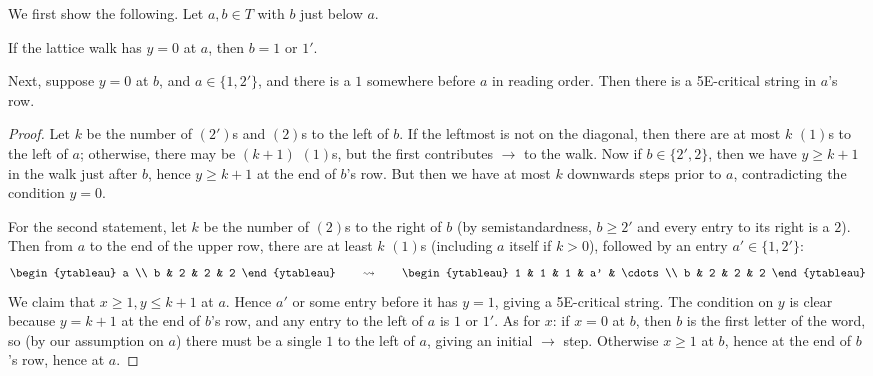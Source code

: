 \documentclass[ALCO,ThmDefs,Unicode,epreuves]{cedram}
\newcommand{\east}[1]{\ensuremath{\xrightarrow{\ #1\ }}}
\begin{document}
We first show the following. Let $a,b \in T$ with $b$ just below $a$.

\begin{lemma} \label{lem:special-ssyt-cases}
If the lattice walk has $y=0$ at $a$, then $b=1$ or $1'$.

Next, suppose $y=0$ at $b$, and $a \in \{1,2'\}$, and there is a $1$ somewhere before $a$ in reading order. Then there is a 5E-critical string in $a$'s row.
\end{lemma}

\begin{proof}
Let $k$ be the number of $(2')$s and $(2)$s to the left of $b$. If the leftmost is not on the diagonal, then there are at most $k$ $(1)$s to the left of $a$; otherwise, there may be $(k+1)$ $(1)$s, but the first contributes $\east{}$ to the walk. Now if $b \in \{2',2\}$, then we have $y \geq k+1$ in the walk just after $b$, hence $y \geq k+1$ at the end of $b$'s row. But then we have at most $k$ downwards steps prior to $a$, contradicting the condition $y=0$.

For the second statement, let $k$ be the number of $(2)$s to the right of $b$ (by semistandardness, $b \geq 2'$ and every entry to its right is a $2$). Then from $a$ to the end of the upper row, there are at least $k$ $(1)$s (including $a$ itself if $k>0$), followed by an entry $a' \in \{1,2'\}$:
\[
\begin{ytableau}
a \\
b & 2 & 2 & 2
\end{ytableau} \qquad \leadsto \qquad 
\begin{ytableau}
1 & 1 & 1 & a' & \cdots \\
b & 2 & 2 & 2
\end{ytableau}
\]
We claim that $x \geq 1, y \leq k+1$ at $a$. Hence $a'$ or some entry before it has $y=1$, giving a 5E-critical string. The condition on $y$ is clear because $y=k+1$ at the end of $b$'s row, and any entry to the left of $a$ is $1$ or $1'$. As for $x$: if $x=0$ at $b$, then $b$ is the first letter of the word, so (by our assumption on $a$) there must be a single $1$ to the left of $a$, giving an initial $\east{}$ step. Otherwise $x \geq 1$ at $b$, hence at the end of $b$'s row, hence at $a$.
\end{proof}
\end{document}
